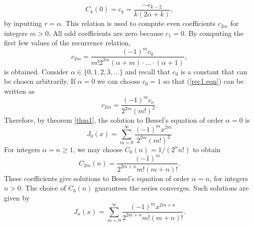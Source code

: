 \documentclass[12pt]{article}
\theoremstyle{definition}
\numberwithin{equation}{section}
\begin{document}
{$$C_k(0)=c_k=\frac{-c_{k-2}}{k(2\alpha+k)},$$
by inputting $r=\alpha$. This relation is used to compute even coefficients $c_{2m}$ for integers $m>0$. All odd coefficients are zero because $c_1=0$. By computing the first few values of the recurrence relation,
\begin{equation}
c_{2m}=\frac{(-1)^mc_0}{m!2^{2m}(\alpha+m)\cdot...\cdot(\alpha+1)},
\label{rec1.eqn}
\end{equation}
is obtained. Consider $\alpha\in\{0,1,2,3,...\}$ and recall that $c_0$ is a constant that can be chosen arbitrarily. If $\alpha=0$ we can choose $c_0=1$ so that (\ref{rec1.eqn}) can be written as
$$c_{2m}=\frac{(-1)^mc_o}{2^{2m}(m!)^2}.$$
Therefore, by theorem \ref{thm1}, the solution to Bessel's equation of order $\alpha=0$ is
\begin{equation}
J_0(x)=\sum_{m=0}^\infty\frac{(-1)^mx^{2m}}{2^{2m}(m!)^2}
\label{bessel0.eqn}
\end{equation}
For integers $\alpha=n\geq 1$, we may choose $C_0(n)=1\slash(2^nn!)$ to obtain
\begin{equation}
C_{2m}(n)=\frac{(-1)^m}{2^{2m+n}m!(m+n)!}.
\label{nc2m.eqn}
\end{equation}
These coefficients give solutions to Bessel's equation of order $\alpha=n$, for integers $n>0$. The choice of $C_0(n)$ guarantees the series converges. Such solutions are given by
\begin{equation}
J_n(x)=\sum_{m=0}^\infty\frac{(-1)^mx^{2m+n}}{2^{2m+n}m!(m+n)!}.
\label{besseln.eqn}
\end{equation}

}
\end{document}
